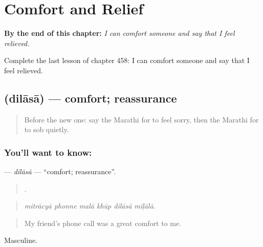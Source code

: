 
\chapter{Comfort and Relief}
\label{ch:mr-comfort-and-relief}

\begin{chapteropening}
\textbf{By the end of this chapter:} \emph{I can comfort someone and say that I feel relieved.}

Complete the last lesson of chapter 458: I can comfort someone and say that I feel relieved.
\end{chapteropening}

\section[\texorpdfstring{\mr{दिलासा} (dilāsā)}{दिलासा (dilāsā)}]{ (dilāsā) — comfort; reassurance}

\label{lesson:MR-C458-dilasa}



\begin{quote}
Before the new one: say the Marathi for to feel sorry, then the Marathi for to sob quietly.
\end{quote}

\subsection*{You'll want to know: }
\textbf{} — \emph{dilāsā} — \textquotedblleft{}comfort; reassurance\textquotedblright{}.

\begin{quote}
     .
\end{quote}

\begin{quote}
\emph{mitrācyā phonne malā khūp dilāsā miḷālā.}
\end{quote}

\begin{quote}
My friend's phone call was a great comfort to me.
\end{quote}

Masculine.

